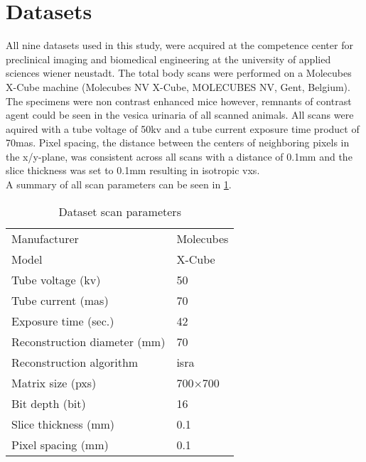 \section{Datasets}\label{s:datasets}
All nine datasets used in this study, were acquired at the competence center for preclinical imaging and biomedical engineering at the university of applied sciences wiener neustadt.
The total body scans were performed on a Molecubes X-Cube \mct\space machine (Molecubes NV X-Cube, MOLECUBES NV, Gent, Belgium).
The specimens were non contrast enhanced mice however, remnants of contrast agent could be seen in the vesica urinaria of all scanned animals.
All scans were aquired with a tube voltage of 50\acrshort{kv} and a tube current exposure time product of 70\acrshort{mas}.
Pixel spacing, the distance between the centers of neighboring pixels in the x/y-plane, was consistent across all scans with a distance of 0.1mm and the slice thickness was set to 0.1mm resulting in isotropic \glspl{vx}.\\
A summary of all scan parameters can be seen in \cref{tab:scan-parameters}.\\
\begin{table}
	\begin{center}
		\begin{tabular}{l l}
			Manufacturer                  & Molecubes      \\
			Model                         & X-Cube         \\
			Tube voltage (\acrshort{kv})  & 50             \\
			Tube current (\acrshort{mas}) & 70             \\
			Exposure time (sec.)          & 42             \\
			Reconstruction diameter (mm)  & 70             \\
			Reconstruction algorithm      & \gls{isra}     \\
			Matrix size (\glspl{px})      & 700$\times$700 \\
			Bit depth (\gls{bit})         & 16             \\
			Slice thickness (mm)          & 0.1            \\
			Pixel spacing (mm)            & 0.1            \\
		\end{tabular}
		\caption{Dataset scan parameters}\label{tab:scan-parameters}
	\end{center}
\end{table}


